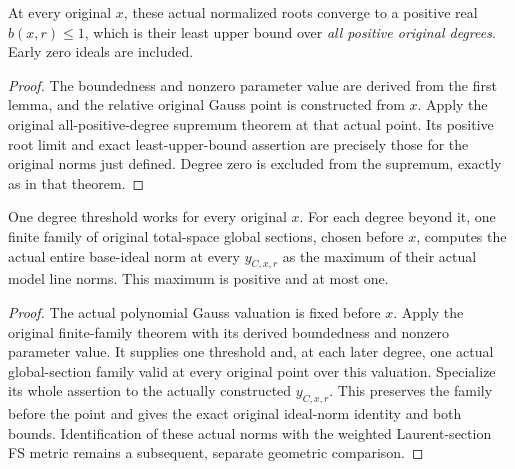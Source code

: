 \begin{theorem}\label{thm:native-test-configuration-actual-gauss-norm-supremum}
\leanok
At every original $x$, these actual normalized roots converge to a
positive real $b(x,r)\leq1$, which is their least upper bound over
\emph{all positive original degrees}. Early zero ideals are included.
\end{theorem}
\begin{proof}
The boundedness and nonzero parameter value are derived from the first
lemma, and the relative original Gauss point is constructed from $x$.
Apply the original all-positive-degree supremum theorem at that actual
point. Its positive root limit and exact least-upper-bound assertion
are precisely those for the original norms just defined. Degree zero
is excluded from the supremum, exactly as in that theorem.
\end{proof}

\begin{theorem}\label{thm:native-test-configuration-actual-gauss-finite-norm-family}
\leanok
One degree threshold works for every original $x$. For each degree
beyond it, one finite family of original total-space global sections,
chosen before $x$, computes the actual entire base-ideal norm at every
$y_{C,x,r}$ as the maximum of their actual model line norms. This
maximum is positive and at most one.
\end{theorem}
\begin{proof}
The actual polynomial Gauss valuation is fixed before $x$. Apply the
original finite-family theorem with its derived boundedness and nonzero
parameter value. It supplies one threshold and, at each later degree,
one actual global-section family valid at every original point over
this valuation. Specialize its whole assertion to the actually
constructed $y_{C,x,r}$. This preserves the family before the point and
gives the exact original ideal-norm identity and both bounds.
Identification of these actual norms with the weighted Laurent-section
FS metric remains a subsequent, separate geometric comparison.
\end{proof}
